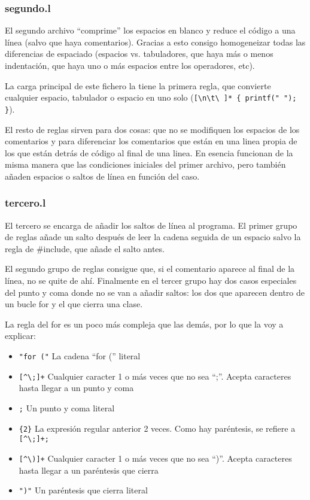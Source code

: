 \documentclass[10pt]{article}
\begin{document}
    \subsubsection{segundo.l}
    El segundo archivo ``comprime'' los espacios en blanco y reduce el código a una línea (salvo que haya comentarios). Gracias a esto consigo homogeneizar todas las diferencias de espaciado (espacios vs. tabuladores, que haya más o menos indentación, que haya uno o más espacios entre los operadores, etc).

    La carga principal de este fichero la tiene la primera regla, que convierte cualquier espacio, tabulador o espacio en uno solo (\verb|[\n\t\ ]* { printf(" "); }|).

    El resto de reglas sirven para dos cosas: que no se modifiquen los espacios de los comentarios y para diferenciar los comentarios que están en una linea propia de los que están detrás de código al final de una linea. En esencia funcionan de la misma manera que las condiciones iniciales del primer archivo, pero también añaden espacios o saltos de línea en función del caso.

    \subsubsection{tercero.l}

    El tercero se encarga de añadir los saltos de línea al programa. El primer grupo de reglas añade un salto después de leer la cadena seguida de un espacio salvo la regla de \#include, que añade el salto antes.

    El segundo grupo de reglas consigue que, si el comentario aparece al final de la línea, no se quite de ahí. Finalmente en el tercer grupo hay dos casos especiales del punto y coma donde no se van a añadir saltos: los dos que aparecen dentro de un bucle for y el que cierra una clase.

    La regla del for es un poco más compleja que las demás, por lo que la voy a explicar:

    \begin{itemize}
        \item \verb|"for ("| La cadena ``for ('' literal
        \item \verb|[^\;]+| Cualquier caracter 1 o más veces que no sea ``;''. Acepta caracteres hasta llegar a un punto y coma
        \item \verb|;| Un punto y coma literal
        \item \verb|{2}| La expresión regular anterior 2 veces. Como hay paréntesis, se refiere a \verb|[^\;]+;|
        \item \verb|[^\)]+| Cualquier caracter 1 o más veces que no sea ``)''. Acepta caracteres hasta llegar a un paréntesis que cierra
        \item \verb|")"| Un paréntesis que cierra literal
    \end{itemize}
\end{document}

